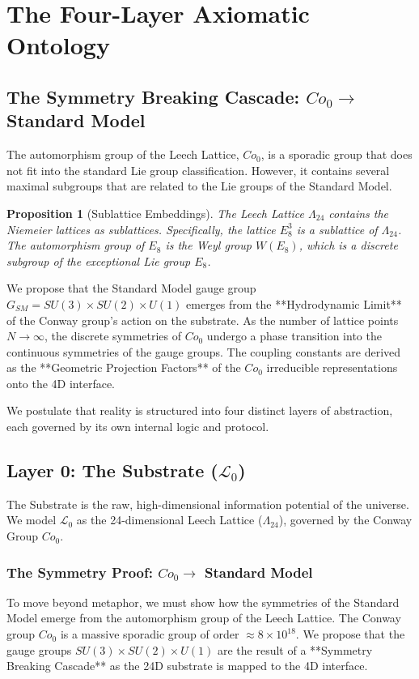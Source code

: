 \documentclass[11pt,titlepage]{article}
\newcommand{\substrate}{\mathcal{L}_0}
\newcommand{\leech}{\Lambda_{24}}
\newcommand{\conway}{Co_0}
\newtheorem{proposition}{Proposition}[section]
\begin{document}
\section{The Four-Layer Axiomatic Ontology}
\subsection{The Symmetry Breaking Cascade: $\conway \to$ Standard Model}
The automorphism group of the Leech Lattice, $Co_0$, is a sporadic group that does not fit into the standard Lie group classification. However, it contains several maximal subgroups that are related to the Lie groups of the Standard Model.

\begin{proposition}[Sublattice Embeddings]
The Leech Lattice $\leech$ contains the Niemeier lattices as sublattices. Specifically, the lattice $E_8^3$ is a sublattice of $\leech$. The automorphism group of $E_8$ is the Weyl group $W(E_8)$, which is a discrete subgroup of the exceptional Lie group $E_8$.
\end{proposition}

We propose that the Standard Model gauge group $G_{SM} = SU(3) \times SU(2) \times U(1)$ emerges from the **Hydrodynamic Limit** of the Conway group's action on the substrate. As the number of lattice points $N \to \infty$, the discrete symmetries of $Co_0$ undergo a phase transition into the continuous symmetries of the gauge groups. The coupling constants are derived as the **Geometric Projection Factors** of the $Co_0$ irreducible representations onto the 4D interface.

\label{sec:ontology}
We postulate that reality is structured into four distinct layers of abstraction, each governed by its own internal logic and protocol.

\subsection{Layer 0: The Substrate ($\substrate$)}
The Substrate is the raw, high-dimensional information potential of the universe. We model $\substrate$ as the 24-dimensional Leech Lattice ($\leech$), governed by the Conway Group $\conway$. 

\subsubsection{The Symmetry Proof: $\conway \to$ Standard Model}
To move beyond metaphor, we must show how the symmetries of the Standard Model emerge from the automorphism group of the Leech Lattice. The Conway group $Co_0$ is a massive sporadic group of order $\approx 8 \times 10^{18}$. We propose that the gauge groups $SU(3) \times SU(2) \times U(1)$ are the result of a **Symmetry Breaking Cascade** as the 24D substrate is mapped to the 4D interface.
\end{document}
